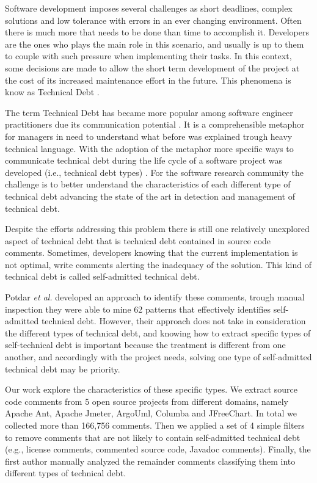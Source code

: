Software development imposes several challenges as short deadlines, complex solutions and low tolerance with errors in an ever changing environment. Often there is much more that needs to be done than time to accomplish it. Developers are the ones who plays the main role in this scenario, and usually is up to them to couple with such pressure when implementing their tasks. In this context, some decisions are made to allow the short term development of the project at the cost of its increased maintenance effort in the future. This phenomena is know as Technical Debt \cite{Cunningham1992}. 

The term Technical Debt has became more popular among software engineer practitioners due its communication potential \cite{Spinola2013MTD}. It is a comprehensible metaphor for managers in need to understand what before was explained trough heavy technical language. With the adoption of the metaphor more specific ways to communicate technical debt during the life cycle of a software project was developed (i.e., technical debt types) \cite{Alves2014MTD}\cite{Kruchten2012}. For the software research community the challenge is to better understand the characteristics of each different type of technical debt advancing the state of the art in detection and management of technical debt.


Despite the efforts addressing this problem there is still one relatively unexplored aspect of technical debt that is technical debt contained in source code comments. Sometimes, developers knowing that the current implementation is not optimal, write comments alerting the inadequacy of the solution. This kind of technical debt is called self-admitted technical debt. 

Potdar \textit{et al.} \cite{Potdar2014ICSME} developed an approach to identify these comments, trough manual inspection they were able to mine 62 patterns that effectively identifies self-admitted technical debt. However, their approach does not take in consideration the different types of technical debt, and knowing how to extract specific types of self-technical debt is important because the treatment is different from one another, and accordingly with the project needs, solving one type of self-admitted technical debt may be priority.

Our work explore the characteristics of these specific types. We extract source code comments from 5 open source projects from different domains, namely Apache Ant, Apache Jmeter, ArgoUml, Columba and JFreeChart. In total we collected more than 166,756 comments. Then we applied a set of 4 simple filters to remove comments that are not likely to contain self-admitted technical debt (e.g., license comments, commented source code, Javadoc comments). Finally, the first author manually analyzed the remainder comments classifying them into different types of technical debt. 

